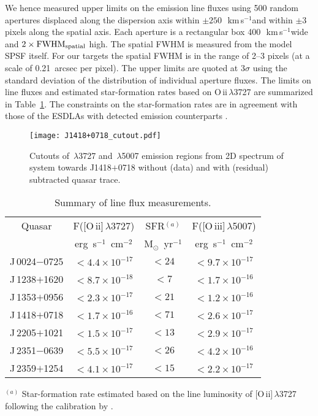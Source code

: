 \documentclass[fleqn,usenatbib,useAMS]{mnras}
\newcommand{\kms}{\,km\,s$^{-1}$} %
\begin{document}
We hence measured upper limits on the emission line fluxes using 500 random apertures displaced along the dispersion axis within $\pm250$~\kms and within $\pm$3 pixels along the spatial axis. Each aperture is a rectangular box 400~\kms wide and $2\times {\rm FWHM_{spatial}}$ high. The spatial FWHM is measured from the model SPSF itself. For our targets the spatial FWHM is in the range of 2--3 pixels (at a scale of 0.21~arcsec per pixel). The upper limits are quoted at 3$\sigma$ using the standard deviation of the distribution of individual aperture fluxes. The limits on line fluxes and estimated star-formation rates based on O\,{\sc ii}\,$\lambda$3727 are summarized in Table~\ref{tab:emission_lines}. The constraints on the star-formation rates are in agreement with those of the ESDLAs with detected emission counterparts \citep{Moller2004,Kulkarni2012,Noterdaeme2012b,Ranjan2020}.


\begin{figure}
\texttt{[image: J1418+0718\_cutout.pdf]}
\caption{Cutouts of  \,$\lambda$3727 and \,$\lambda$5007 emission regions from 2D spectrum of system towards J1418$+$0718 without (data) and with (residual) subtracted quasar trace. }
\label{fig:J1418_emission}
\end{figure}

\begin{table}
\caption{Summary of line flux measurements.}
\label{tab:emission_lines}
\begin{tabular}{cccc}
 \hline

Quasar & F([O\,{\sc ii}]\,$\lambda$3727) & SFR$^{(a)}$ & F([O\,{\sc iii}]\,$\lambda$5007) \\
 & erg~s$^{-1}$~cm$^{-2}$ & M$_{\odot}$~yr$^{-1}$ & erg~s$^{-1}$~cm$^{-2}$ \\
 \hline
J\,0024$-$0725 & $ < 4.4 \times 10^{-17}$ & $ < 24 $ & $ < 9.7 \times 10^{-17}$ \\
J\,1238$+$1620 & $ < 8.7 \times 10^{-18}$ & $ < 7  $ & $ < 1.7 \times 10^{-16}$ \\
J\,1353$+$0956 & $ < 2.3 \times 10^{-17}$ & $ < 21 $ & $ < 1.2 \times 10^{-16}$ \\
J\,1418$+$0718 & $ < 1.7 \times 10^{-16}$ & $ < 71 $ & $ < 2.6 \times 10^{-17}$ \\
J\,2205$+$1021 & $ < 1.5 \times 10^{-17}$ & $ < 13 $ & $ < 2.9 \times 10^{-17}$ \\
J\,2351$-$0639 & $ < 5.5 \times 10^{-17}$ & $ < 26 $ & $ < 4.2 \times 10^{-16}$ \\
J\,2359$+$1254 & $ < 4.1 \times 10^{-17}$ & $ < 15 $ & $ < 2.2 \times 10^{-17}$ \\
 \hline
\end{tabular}

{\flushleft
$^{(a)}$ Star-formation rate estimated based on the line luminosity of [O\,{\sc ii}]\,$\lambda$3727 following the calibration by \citet{Kennicutt1998}.
}
\end{table}
\end{document}
